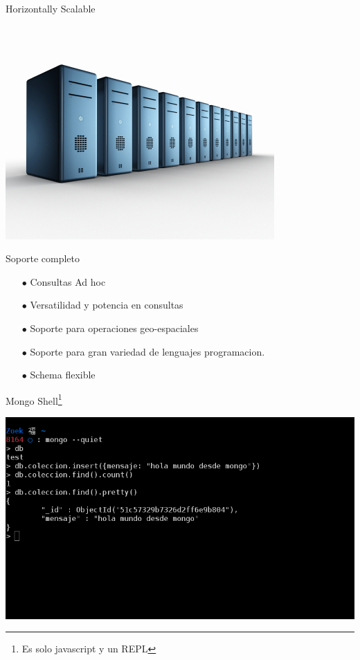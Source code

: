 \documentclass[12pt]{beamer}
\begin{document}
\begin{frame}{Horizontally Scalable}
  \begin{center}
    \includegraphics[scale=2]{Img/horizontal-scalability.jpg}    
  \end{center}
\end{frame}



\begin{frame}{Soporte completo}
  \begin{itemize}
  \item[$\bullet$] Consultas Ad hoc

  \item[$\bullet$] Versatilidad y potencia en consultas

  \item[$\bullet$] Soporte para operaciones geo-espaciales

  \item[$\bullet$] Soporte para gran variedad de lenguajes
    programacion.

  \item[$\bullet$] Schema flexible
  \end{itemize}
\end{frame}

\begin{frame}{Mongo Shell\footnote{Es solo javascript y un REPL}}
  \begin{center}
    \includegraphics[scale=0.3]{Img/shell-mongo.png}    
  \end{center}
\end{frame}
\end{document}
